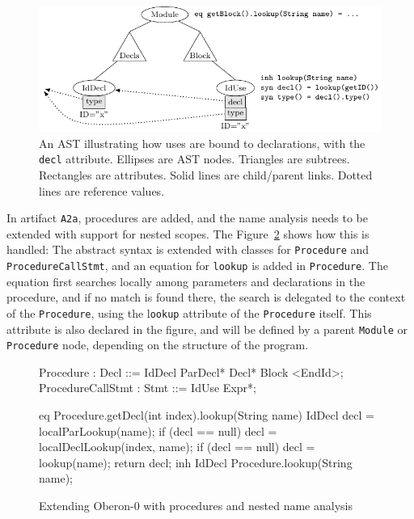 \begin{figure}[h]
\begin{center}
\includegraphics{jastadd/use-decl.pdf}
\caption{An AST illustrating how uses are bound to declarations, with the \texttt{decl} attribute. 
	Ellipses are AST nodes. Triangles are subtrees. Rectangles are attributes. 
	Solid lines are child/parent links. Dotted lines are reference values.}
\label{JA-UseDecl}
\end{center}
\end{figure}

In artifact \texttt{A2a}, procedures are added, and the name analysis needs to be extended with support for nested scopes. The Figure~\ref{JA-ProcNameAnalysis} shows how this is handled: The abstract syntax is extended with classes for \texttt{Procedure} and \texttt{ProcedureCallStmt}, and an equation for \texttt{lookup} is added in \texttt{Procedure}. The equation first searches locally among parameters and declarations in the procedure, and if no match is found there, the search is delegated to the context of the \texttt{Procedure}, using the l\texttt{ookup} attribute of the \texttt{Procedure} itself. This attribute is also declared in the figure, and will be defined by a parent \texttt{Module} or \texttt{Procedure} node, depending on the structure of the program.

\begin{figure}
\begin{jastaddcode}
Procedure : Decl ::= IdDecl ParDecl* Decl* Block <EndId>;
ProcedureCallStmt : Stmt ::= IdUse Expr*;

eq Procedure.getDecl(int index).lookup(String name) {
	IdDecl decl = localParLookup(name);
	if (decl == null) decl = localDeclLookup(index, name);
	if (decl == null) decl = lookup(name);
	return decl;
}
inh IdDecl Procedure.lookup(String name);
\end{jastaddcode}
\vspace{-15pt}
\caption{Extending Oberon-0 with procedures and nested name analysis} 
\label{JA-ProcNameAnalysis}
\end{figure}

